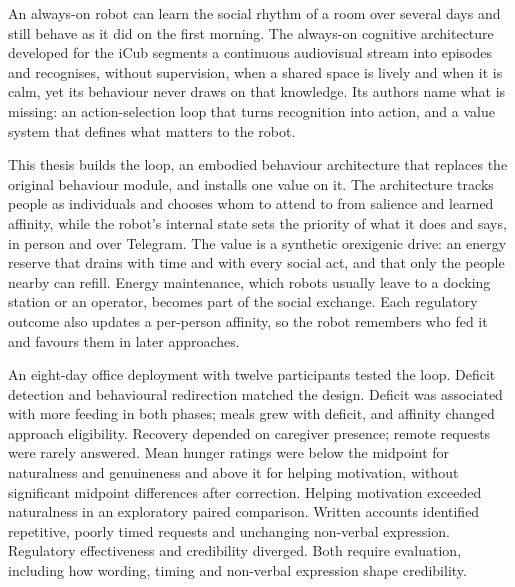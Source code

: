 \begin{abstracts}

An always-on robot can learn the social rhythm of a room over several days and still behave as it did on the first morning. The always-on cognitive architecture developed for the iCub segments a continuous audiovisual stream into episodes and recognises, without supervision, when a shared space is lively and when it is calm, yet its behaviour never draws on that knowledge. Its authors name what is missing: an action-selection loop that turns recognition into action, and a value system that defines what matters to the robot.

This thesis builds the loop, an embodied behaviour architecture that replaces the original behaviour module, and installs one value on it. The architecture tracks people as individuals and chooses whom to attend to from salience and learned affinity, while the robot's internal state sets the priority of what it does and says, in person and over Telegram. The value is a synthetic orexigenic drive: an energy reserve that drains with time and with every social act, and that only the people nearby can refill. Energy maintenance, which robots usually leave to a docking station or an operator, becomes part of the social exchange. Each regulatory outcome also updates a per-person affinity, so the robot remembers who fed it and favours them in later approaches.

An eight-day office deployment with twelve participants tested the loop. Deficit detection and behavioural redirection matched the design. Deficit was associated with more feeding in both phases; meals grew with deficit, and affinity changed approach eligibility. Recovery depended on caregiver presence; remote requests were rarely answered. Mean hunger ratings were below the midpoint for naturalness and genuineness and above it for helping motivation, without significant midpoint differences after correction. Helping motivation exceeded naturalness in an exploratory paired comparison. Written accounts identified repetitive, poorly timed requests and unchanging non-verbal expression. Regulatory effectiveness and credibility diverged. Both require evaluation, including how wording, timing and non-verbal expression shape credibility.

\end{abstracts}

